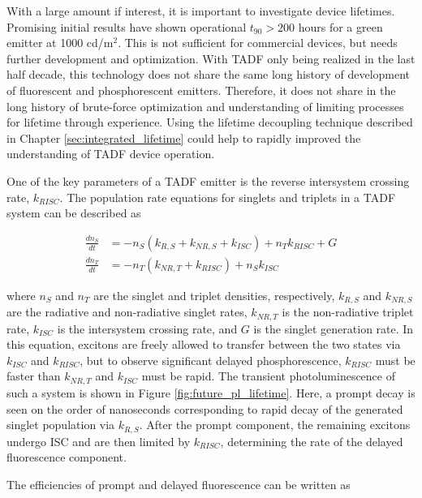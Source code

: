 \documentclass[../thesis.tex]{subfiles}
\begin{document}
With a large amount if interest, it is important to investigate device lifetimes.
Promising initial results have shown operational $t_{90}>200$ hours for a green emitter at 1000 cd/m$^2$.\supercite{Cho2014}
This is not sufficient for commercial devices, but needs further development and optimization.
With TADF only being realized in the last half decade, this technology does not share the same long history of development of fluorescent and phosphorescent emitters.\supercite{Tang1987,Tang1989a,Baldo1998a,OBrien1999a,Baldo2000}
Therefore, it does not share in the long history of brute-force optimization and understanding of limiting processes for lifetime through experience.
Using the lifetime decoupling technique described in Chapter \ref{sec:integrated_lifetime} could help to rapidly improved the understanding of TADF device operation.


One of the key parameters of a TADF emitter is the reverse intersystem crossing rate, $k_{RISC}$.\supercite{Uoyama2012,Zhang2012c,Menke2016,Yersin2014,Jankus2014}
The population rate equations for singlets and triplets in a TADF system can be described as \supercite{Menke2016}

\begin{eqnarray}
\frac{dn_S}{dt} &= -n_S(k_{R,S}+k_{NR,S}+k_{ISC})+n_{T}k_{RISC}+G \label{eqn:tadf_ns} \\
\frac{dn_T}{dt} &= -n_T(k_{NR,T}+k_{RISC})+n_Sk_{ISC} \label{eqn:tadf_nt}
\end{eqnarray}

where $n_S$ and $n_T$ are the singlet and triplet densities, respectively, $k_{R,S}$ and $k_{NR,S}$ are the radiative and non-radiative singlet rates, $k_{NR,T}$ is the non-radiative triplet rate, $k_{ISC}$ is the intersystem crossing rate, and $G$ is the singlet generation rate.
In this equation, excitons are freely allowed to transfer between the two states via $k_{ISC}$ and $k_{RISC}$, but to observe significant delayed phosphorescence, $k_{RISC}$ must be faster than $k_{NR,T}$ and $k_{ISC}$ must be rapid.
The transient photoluminescence of such a system is shown in Figure \ref{fig:future_pl_lifetime}.
Here, a prompt decay is seen on the order of nanoseconds corresponding to rapid decay of the generated singlet population via $k_{R,S}$.
After the prompt component, the remaining excitons undergo ISC and are then limited by $k_{RISC}$, determining the rate of the delayed fluorescence component.

The efficiencies of prompt and delayed fluorescence can be written as
\end{document}
